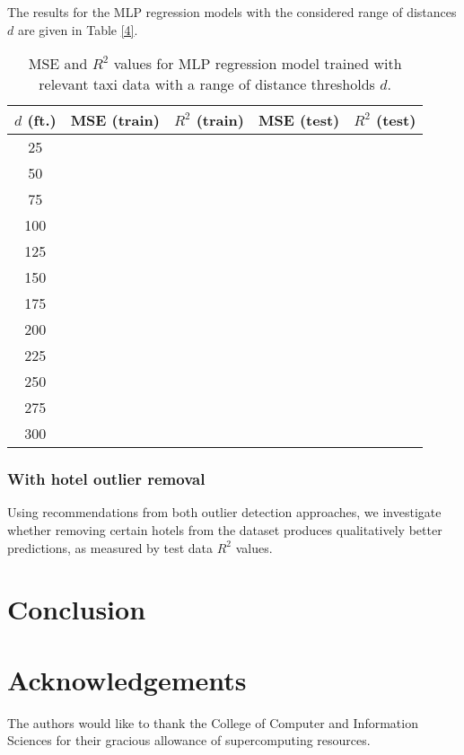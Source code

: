 \documentclass[useAMS, usenatbib]{biom}
\begin{document}
The results for the MLP regression models with the considered range of distances $d$ are given in Table \ref{4}.

\begin{table}
\caption{MSE and $R^2$ values for MLP regression model trained with relevant taxi data with a range of distance thresholds $d$.}
\label{t:taxi_performance}
\begin{center}
\resizebox{\columnwidth}{!}
{
 \begin{tabular}{||c|c|c|c|c||}
 \hline
 $d$ (ft.) & MSE (train) & $R^2$ (train) & MSE (test) & $R^2$ (test) \\
 \hline
 25 &  &  &  &  \\
 50 &  &  &  &  \\
 75 &  &  &  &  \\
 100 &  &  &  &  \\
 125 &  &  &  &  \\
 150 &  &  &  &  \\
 175 &  &  &  &  \\
 200 &  &  &  &  \\
 225 &  &  &  &  \\
 250 &  &  &  &  \\
 275 &  &  &  &  \\
 300 &  &  &  &  \\
 \hline
\end{tabular}
}
\end{center}
\end{table}

\subsubsection{With hotel outlier removal}

Using recommendations from both outlier detection approaches, we investigate whether removing certain hotels from the dataset produces qualitatively better predictions, as measured by test data $R^2$ values.

\section{Conclusion}
\label{s:conclusion}

\backmatter

\section*{Acknowledgements}

The authors would like to thank the College of Computer and Information Sciences for their gracious allowance of supercomputing resources.

 


\label{lastpage}
\end{document}
